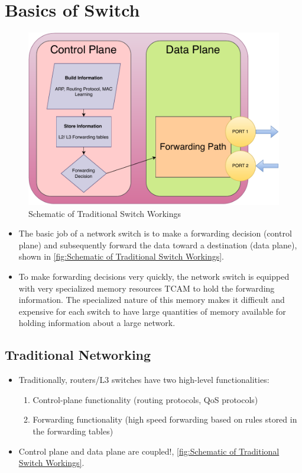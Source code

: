 \documentclass[12pt,letterpaper]{article}
\begin{document}
    \newpage
    
    \section{Basics of Switch}

    \begin{figure}[ht]
        \centering
        \includegraphics[height = 8 cm]{images/basicSwitch.drawio.pdf}
        \caption{Schematic of Traditional Switch Workings}
        \label{fig:Schematic of Traditional Switch Workings}
    \end{figure}

    \begin{itemize}
        \item The basic job of a network switch is to make a forwarding decision (control plane) and subsequently forward the data toward a destination (data plane), shown in \autoref{fig:Schematic of Traditional Switch Workings}.
        \item To make forwarding decisions very quickly, the network switch is equipped with very specialized memory resources \ac{TCAM} to hold the forwarding information. The specialized nature of this memory makes it difficult and expensive for each switch to have large quantities of memory available for holding information about a large network.
    \end{itemize}

    \subsection{Traditional Networking}

    \begin{itemize}
        \item  Traditionally, routers/L3 switches have two high-level functionalities:
        \begin{enumerate}
            \item Control-plane functionality (routing protocols, QoS protocols)
            \item Forwarding functionality (high speed forwarding based on rules stored in the forwarding tables)
        \end{enumerate}
        \item Control plane and data plane are coupled!, \autoref{fig:Schematic of Traditional Switch Workings}.

    \end{itemize}
\end{document}
